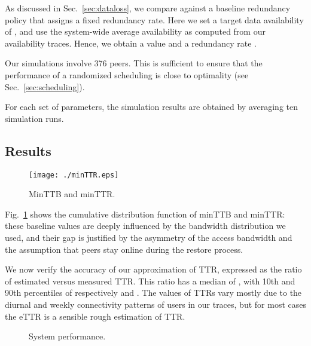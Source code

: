 \documentclass[conference,10pt]{IEEEtran}
\begin{document}
As discussed in Sec.~\ref{sec:dataloss}, we compare against a baseline redundancy policy that assigns a fixed redundancy rate. Here we set a target data availability of , and use the system-wide average availability  as computed from our availability traces. Hence, we obtain a value  and a redundancy rate . 

Our simulations involve 376 peers. This is sufficient to ensure that the performance of a randomized scheduling is close to optimality (see Sec.~\ref{sec:scheduling}).


For each set of parameters, the simulation results are obtained by
averaging ten simulation runs.

\subsection{Results}

\begin{figure}
\centering

\texttt{[image: ./minTTR.eps]}
\caption{MinTTB and minTTR.}
\label{fig:minTTR}
\end{figure}

Fig.~\ref{fig:minTTR} shows the cumulative distribution function of minTTB and minTTR: these baseline values are deeply influenced by the bandwidth distribution we used, and their gap is justified by the asymmetry of the access bandwidth and the assumption that peers stay online during the restore process.


We now verify the accuracy of our approximation of TTR, expressed as the ratio of estimated versus measured TTR. This ratio has a median of , with 10th and 90th percentiles of respectively  and . The values of TTRs vary mostly due to the diurnal and weekly connectivity patterns of users in our traces, but for most cases the eTTR is a sensible rough estimation of TTR.

\begin{figure*}
\centering
\caption{System performance.}
\label{fig:eTTRbased2}
\end{figure*}
\end{document}
